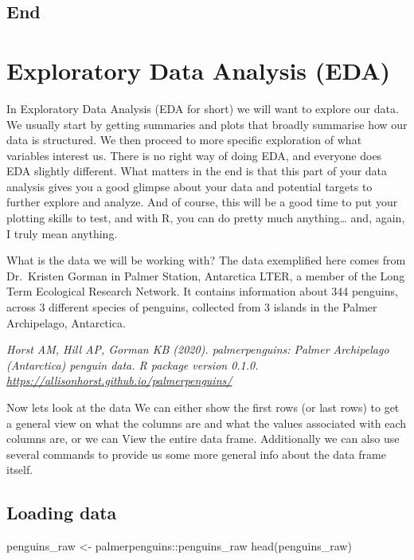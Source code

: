 \documentclass[
]{book}
\newenvironment{Shaded}{\begin{snugshade}}{\end{snugshade}}
\newcommand{\FunctionTok}[1]{\textcolor[rgb]{0.00,0.00,0.00}{#1}}
\newcommand{\NormalTok}[1]{#1}
\newcommand{\OtherTok}[1]{\textcolor[rgb]{0.56,0.35,0.01}{#1}}
\newcommand{\SpecialCharTok}[1]{\textcolor[rgb]{0.00,0.00,0.00}{#1}}
\begin{document}
\hypertarget{end}{%
\section{End}\label{end}}

\hypertarget{exploratory-data-analysis-eda}{%
\chapter{Exploratory Data Analysis (EDA)}\label{exploratory-data-analysis-eda}}

In Exploratory Data Analysis (EDA for short) we will want to explore our data.
We usually start by getting summaries and plots that broadly summarise how our data is structured.
We then proceed to more specific exploration of what variables interest us.
There is no right way of doing EDA, and everyone does EDA slightly different.
What matters in the end is that this part of your data analysis gives you a good glimpse about your data and potential targets to further explore and analyze.
And of course, this will be a good time to put your plotting skills to test, and with R, you can do pretty much anything\ldots{} and, again, I truly mean anything.

What is the data we will be working with?
The data exemplified here comes from Dr.~Kristen Gorman in Palmer Station, Antarctica LTER, a member of the Long Term Ecological Research Network.
It contains information about 344 penguins, across 3 different species of penguins, collected from 3 islands in the Palmer Archipelago, Antarctica.

\emph{Horst AM, Hill AP, Gorman KB (2020). palmerpenguins: Palmer Archipelago (Antarctica) penguin data. R package version 0.1.0. \url{https://allisonhorst.github.io/palmerpenguins/}}

Now lets look at the data We can either show the first rows (or last rows) to get a general view on what the columns are and what the values associated with each columns are, or we can View the entire data frame.
Additionally we can also use several commands to provide us some more general info about the data frame itself.

\hypertarget{loading-data}{%
\section{Loading data}\label{loading-data}}

\begin{Shaded}
\begin{Highlighting}[]
\NormalTok{penguins\_raw }\OtherTok{\textless{}{-}}\NormalTok{ palmerpenguins}\SpecialCharTok{::}\NormalTok{penguins\_raw}
\FunctionTok{head}\NormalTok{(penguins\_raw)}
\end{Highlighting}
\end{Shaded}
\end{document}

